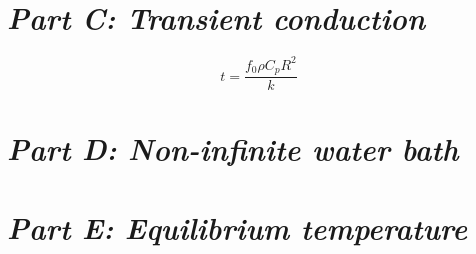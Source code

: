 \documentclass[11pt]{article}
\begin{document}
\section{\emph{Part C: Transient conduction}}
\begin{equation}
	t=\frac{f_{0} \rho C_{p} R^{2}}{k}
\end{equation}
\section{\emph{Part D: Non-infinite water bath}}

\section{\emph{Part E: Equilibrium temperature}}



\end{document}

